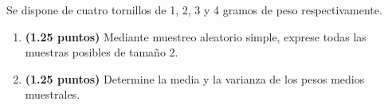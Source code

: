 
Se dispone de cuatro tornillos de 1, 2, 3 y 4 gramos de peso respectivamente.
\begin{enumerate}[label=\alph*)]
\item \textbf{(1.25 puntos)} Mediante muestreo aleatorio simple, exprese todas las muestras posibles de tamaño 2.
\item \textbf{(1.25 puntos)} Determine la media y la varianza de los pesos medios muestrales.
\end{enumerate}
